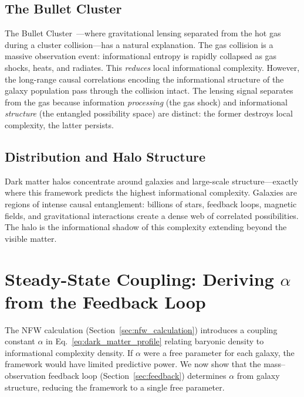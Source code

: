 \documentclass[12pt,a4paper]{article}
\begin{document}
\subsection{The Bullet Cluster}

The Bullet Cluster~\cite{Clowe2006}---where gravitational lensing separated from the hot gas during a cluster collision---has a natural explanation. The gas collision is a massive observation event: informational entropy is rapidly collapsed as gas shocks, heats, and radiates. This \emph{reduces} local informational complexity. However, the long-range causal correlations encoding the informational structure of the galaxy population pass through the collision intact. The lensing signal separates from the gas because information \emph{processing} (the gas shock) and informational \emph{structure} (the entangled possibility space) are distinct: the former destroys local complexity, the latter persists.

\subsection{Distribution and Halo Structure}

Dark matter halos concentrate around galaxies and large-scale structure---exactly where this framework predicts the highest informational complexity. Galaxies are regions of intense causal entanglement: billions of stars, feedback loops, magnetic fields, and gravitational interactions create a dense web of correlated possibilities. The halo is the informational shadow of this complexity extending beyond the visible matter.

\section{Steady-State Coupling: Deriving $\alpha$ from the Feedback Loop}
\label{sec:steadystate}

The NFW calculation (Section~\ref{sec:nfw_calculation}) introduces a coupling constant $\alpha$ in Eq.~\eqref{eq:dark_matter_profile} relating baryonic density to informational complexity density. If $\alpha$ were a free parameter for each galaxy, the framework would have limited predictive power. We now show that the mass--observation feedback loop (Section~\ref{sec:feedback}) determines $\alpha$ from galaxy structure, reducing the framework to a single free parameter.
\end{document}
